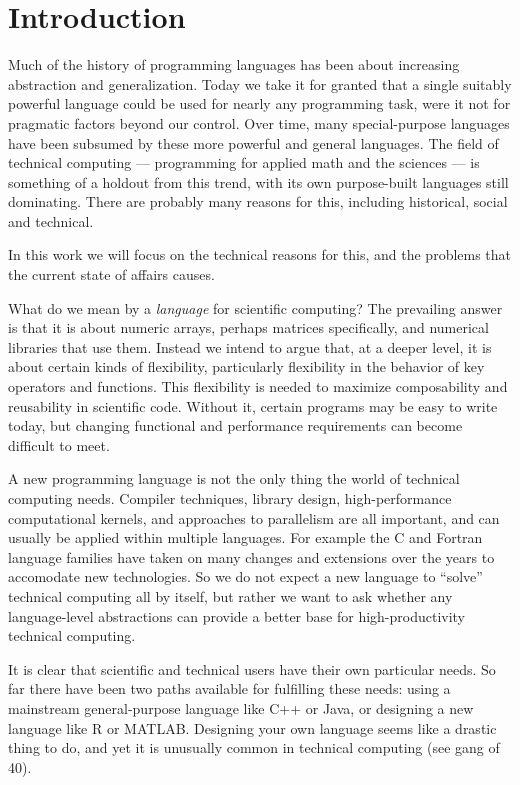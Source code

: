\chapter{Introduction}

Much of the history of programming languages has been about increasing abstraction
and generalization. Today we take it for granted that a single suitably powerful
language could be used for nearly any programming task, were it not for pragmatic
factors beyond our control. Over time, many special-purpose languages
have been subsumed by these more powerful and general languages.
The field of technical computing --- programming for applied math and the
sciences --- is something of a holdout from this trend, with its own
purpose-built languages still dominating.
There are probably many reasons for this, including historical, social and
technical.

In this work we will focus on the technical reasons for this, and the
problems that the current state of affairs causes.

What do we mean by a \emph{language} for scientific computing?
The prevailing
answer is that it is about numeric arrays, perhaps matrices specifically,
and numerical libraries that use them.
Instead we intend to argue that, at a
deeper level, it is about certain kinds of flexibility, particularly
flexibility in the behavior of key operators and functions. This flexibility
is needed to maximize composability and reusability in scientific code.
Without it, certain programs may be easy to write today, but changing
functional and performance requirements can become difficult to meet.


A new programming language is not the only thing the world of technical
computing needs. Compiler techniques, library design, high-performance
computational kernels, and approaches to parallelism are all important,
and can usually be applied within multiple languages. For example the C
and Fortran language families have taken on many changes and extensions
over the years to accomodate new technologies. So we do not expect a
new language to ``solve'' technical computing all by itself, but rather
we want to ask whether any language-level abstractions can provide a
better base for high-productivity technical computing.


It is clear that scientific and technical users have their own particular
needs. So far there have been two paths available for fulfilling these
needs: using a mainstream general-purpose language like C++ or Java, or
designing a new language like R or MATLAB. Designing your own language
seems like a drastic thing to do, and yet it is unusually common in
technical computing (see gang of 40).


